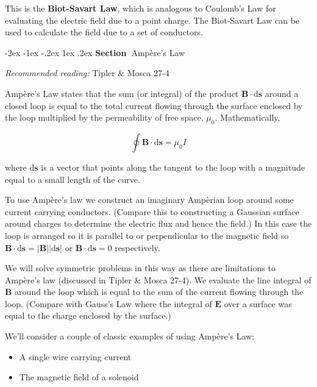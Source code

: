 \documentclass[
]{book}
\makeatletter
\renewcommand\section{%
\@startsection{section}{1}{\z@}%
              {-2ex \@plus -1ex \@minus -.2ex}%
              {1ex \@plus .2ex}%
              {\sffamily\bfseries\large\noindent Section~}}
\numberwithin{equation}{section}
\makeatother
\begin{document}
This is the \textbf{Biot-Savart Law}, which is analogous to Coulomb's Law for
evaluating the electric field due to a point charge. The Biot-Savart Law
can be used to calculate the field due to a set of conductors.  

\hypertarget{ampuxe8res-law}{%
\section{Ampère's Law}\label{ampuxe8res-law}}

\emph{Recommended reading:} Tipler \& Mosca 27-4

Ampère's Law states that the sum (or integral) of the product
\(\mathbf{B} \cdot \mathrm{d}\mathbf{s}\) around a closed loop is equal to the total current
flowing through the surface enclosed by the loop multiplied by the
permeability of free space, \(\mu_0\). Mathematically,

\begin{equation}
\label{eq:BloopIntegral}
\oint \mathbf{B} \cdot \mathrm{d} \mathbf{s} = \mu_0 I
\end{equation}

where \(\mathrm{d}\mathbf{s}\) is a vector that points along the tangent to the loop with
a magnitude equal to a small length of the curve.

To use Ampère's law we construct an imaginary Ampèrian loop around some
current carrying conductors. (Compare this to constructing a Gaussian
surface around charges to determine the electric flux and hence the
field.) In this case the loop is arranged so it is parallel to or
perpendicular to the magnetic field so \(\mathbf{B} \cdot \mathrm{d}\mathbf{s} =|\mathbf{B}||\mathrm{d}\mathbf{s}|\) or
\(\mathbf{B}\cdot \mathrm{d}\mathbf{s} = 0\) respectively.

We will solve symmetric problems in this way as there are limitations to
Ampère's law (discussed in Tipler \& Mosca 27-4). We evaluate the line
integral of \(\mathbf{B}\) around the loop which is equal to the sum of the
current flowing through the loop. (Compare with Gauss's Law where the
integral of \(\mathbf{E}\) over a surface was equal to the charge enclosed by the
surface.)

We'll consider a couple of classic examples of using Ampère's Law:

\begin{itemize}
\item
  A single wire carrying current
\item
  The magnetic field of a solenoid
\end{itemize}
\end{document}
